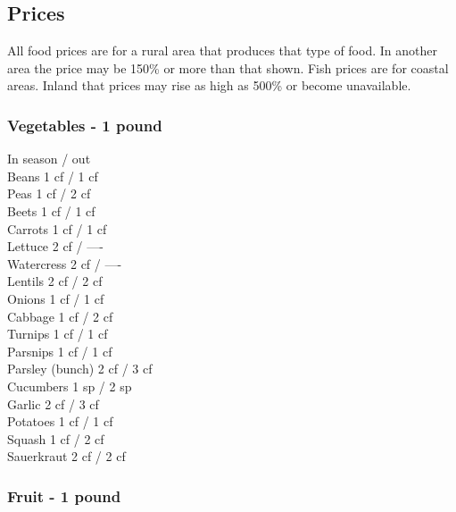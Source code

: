 \begin{multicols}{3}
\subsection{Prices}

All food prices are for a rural area that produces that type of food.
In another area the price may be 150\% or more than that shown.  Fish
prices are for coastal areas.  Inland that prices may rise as high as
500\% or become unavailable.

{\scriptsize
\setcounter{secnumdepth}{1}

\subsubsection{Vegetables - 1 pound}

				\hfill In season / out \\
Beans         			\hfill 1 cf / 1 cf \\
Peas           			\hfill 1 cf / 2 cf \\
Beets          			\hfill 1 cf / 1 cf \\
Carrots        			\hfill 1 cf / 1 cf \\
Lettuce        			\hfill 2 cf / ---- \\
Watercress     			\hfill 2 cf / ---- \\
Lentils        			\hfill 2 cf / 2 cf \\
Onions         			\hfill 1 cf / 1 cf \\
Cabbage        			\hfill 1 cf / 2 cf \\
Turnips        			\hfill 1 cf / 1 cf \\
Parsnips       			\hfill 1 cf / 1 cf \\
Parsley (bunch)			\hfill 2 cf / 3 cf \\
Cucumbers      			\hfill 1 sp / 2 sp \\
Garlic         			\hfill 2 cf / 3 cf \\
Potatoes       			\hfill 1 cf / 1 cf \\
Squash         			\hfill 1 cf / 2 cf \\
Sauerkraut     			\hfill 2 cf / 2 cf \\

\subsubsection{Fruit - 1 pound}

}
\end{multicols}
